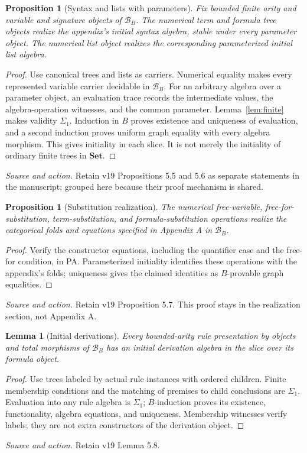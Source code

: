 \documentclass[11pt]{article}
\newtheorem{lemma}[theorem]{Lemma}
\newtheorem{proposition}[theorem]{Proposition}
\theoremstyle{definition}\newtheorem{definition}[theorem]{Definition}
\newcommand{\Set}{\mathbf{Set}}
\newcommand{\B}{\mathcal B}
\newcommand{\source}[1]{\par\smallskip\noindent\textit{Source and action.} #1\par\smallskip}
\begin{document}
\begin{proposition}[Syntax and lists with parameters]\label{prop:syntax}
Fix bounded finite arity and variable and signature objects of
$\B_B$. The numerical term and formula tree objects realize the
appendix's initial syntax algebra, stable under every parameter
object. The numerical list object realizes the corresponding
parameterized initial list algebra.
\end{proposition}
\begin{proof}
Use canonical trees and lists as carriers. Numerical equality makes
every represented variable carrier decidable in $\B_B$.
For an arbitrary algebra
over a parameter object, an evaluation trace records the intermediate
values, the algebra-operation witnesses, and the common parameter.
Lemma~\ref{lem:finite} makes validity $\Sigma_1$. Induction in $B$
proves existence and uniqueness of evaluation, and a second induction
proves uniform graph equality with every algebra morphism. This gives
initiality in each slice. It is not merely the initiality of ordinary
finite trees in $\Set$.
\end{proof}
\source{Retain v19 Propositions 5.5 and 5.6 as separate statements in the manuscript; grouped here because their proof mechanism is shared.}

\begin{proposition}[Substitution realization]\label{prop:substitution}
The numerical free-variable, free-for-substitution, term-substitution,
and formula-substitution operations realize the categorical folds and
equations specified in Appendix A in $\B_B$.
\end{proposition}
\begin{proof}
Verify the constructor equations, including the quantifier case and
the free-for condition, in PA. Parameterized initiality identifies
these operations with the appendix's folds; uniqueness gives the
claimed identities as $B$-provable graph equalities.
\end{proof}
\source{Retain v19 Proposition 5.7. This proof stays in the realization section, not Appendix A.}

\begin{lemma}[Initial derivations]\label{lem:proof-initial}
Every bounded-arity rule presentation by objects and total morphisms
of $\B_B$ has an initial derivation algebra in the slice over its
formula object.
\end{lemma}
\begin{proof}
Use trees labeled by actual rule instances with ordered children.
Finite membership conditions and the matching of premises to child
conclusions are $\Sigma_1$. Evaluation into any rule algebra is
$\Sigma_1$; $B$-induction proves its existence, functionality,
algebra equations, and uniqueness. Membership witnesses verify labels;
they are not extra constructors of the derivation object.
\end{proof}
\source{Retain v19 Lemma 5.8.}
\end{document}
